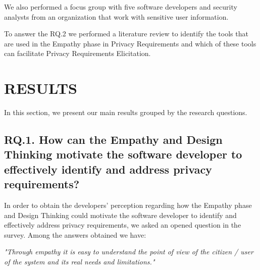 \documentclass[conference]{IEEEtran}
\begin{document}

We also performed a focus group with five software developers and security analysts from an organization that work with sensitive user information.


To answer the RQ.2 we performed a literature review to identify the tools that are used in the Empathy phase in Privacy Requirements and which of these tools can facilitate Privacy Requirements Elicitation.

\section{RESULTS}

In this section, we present our main results grouped by the
research questions.

\subsection{RQ.1. How can the Empathy and Design Thinking motivate the software developer to effectively identify and address privacy requirements?}


In order to obtain the developers' perception regarding how the Empathy phase and Design Thinking could motivate the software developer to identify and effectively address privacy requirements, we asked an opened question in the survey. Among the answers obtained we have:

\begin{mq}
\emph{"Through empathy it is easy to understand the point of view of the citizen / user of the system and its real needs and limitations."}
\end{mq}
\end{document}

